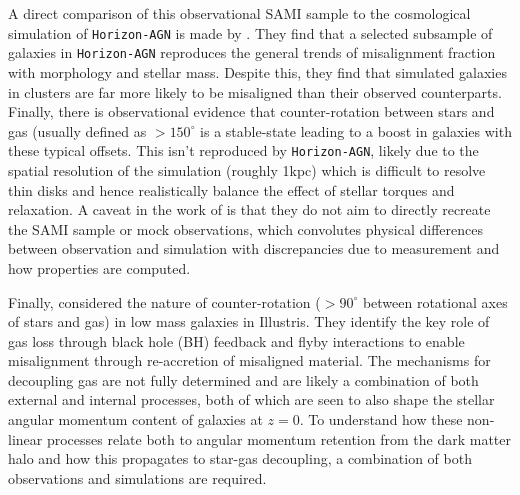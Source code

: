 A direct comparison of this observational SAMI sample to the cosmological simulation of \texttt{Horizon-AGN} is made by \citet{khim2019}. They find that a selected subsample of galaxies in \texttt{Horizon-AGN} reproduces the general trends of misalignment fraction with morphology and stellar mass. Despite this, they find that simulated galaxies in clusters are far more likely to be misaligned than their observed counterparts. Finally, there is observational evidence \citep[e.g.][]{davis2016, chen2016} that counter-rotation between stars and gas (usually defined as $> 150^{\circ}$ is a stable-state leading to a boost in galaxies with these typical offsets. This isn't reproduced by \texttt{Horizon-AGN}, likely due to the spatial resolution of the simulation (roughly 1kpc) which is difficult to resolve thin disks and hence realistically balance the effect of stellar torques and relaxation. A caveat in the work of \citet{khim2019} is that they do not aim to directly recreate the SAMI sample or mock observations, which convolutes physical differences between observation and simulation with discrepancies due to measurement and how properties are computed. 

Finally, \citet{starkenburg+19} considered the nature of counter-rotation ($\mathrm{> 90^{\circ}}$ between rotational axes of stars and gas) in low mass galaxies in Illustris. They identify the key role of gas loss through black hole (BH) feedback and flyby interactions to enable misalignment through re-accretion of misaligned material. The mechanisms for decoupling gas are not fully determined and are likely a combination of both external and internal processes, both of which are seen to also shape the stellar angular momentum content of galaxies at $z=0$. To understand how these non-linear processes relate both to angular momentum retention from the dark matter halo and how this propagates to star-gas decoupling, a combination of both observations and simulations are required. 

